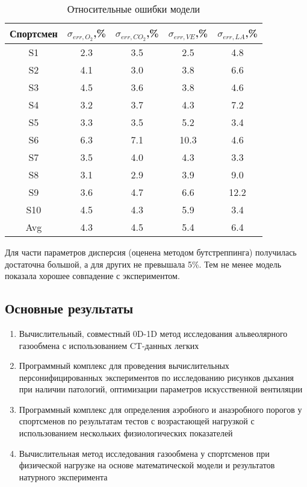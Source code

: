 \begin{table}[!ht]
\centering
\caption{Относительные ошибки модели}
\medskip
\label{tabular:tab3}
\begin{tabular}{|c|c|c|c|c|}
\hline
Спортсмен & \(\sigma_{err,O_{2}}\),\%  & \(\sigma_{err,CO_{2}}\),\% & \(\sigma_{err,VE}\),\% & \(\sigma_{err,LA}\),\%\\
\hline
S1 & 2.3 & 3.5 & 2.5 & 4.8 \\
\hline
S2 & 4.1 & 3.0 & 3.8 & 6.6 \\
\hline
S3 & 4.5 & 3.6 & 3.8 & 4.6  \\
\hline
S4 & 3.2 & 3.7 & 4.3 & 7.2  \\
\hline
S5 & 3.3 & 3.5 & 5.2 & 3.4  \\
\hline
S6 & 6.3 & 7.1 & 10.3 & 4.6  \\
\hline
S7 & 3.5 & 4.0 & 4.3 & 3.3  \\
\hline
S8 & 3.1 & 2.9 & 3.9 & 9.0  \\
\hline
S9 & 3.6 & 4.7 & 6.6 & 12.2  \\
\hline
S10 & 4.5 & 4.3 & 5.9 & 3.4  \\
\hline
Avg & 4.3 & 4.5 & 5.4 & 6.4  \\
\hline
\end{tabular}
\end{table}

Для части параметров дисперсия (оценена методом бутстреппинга) получилась достаточна большой, а для других не превышала 5\%. Тем не менее модель показала хорошее совпадение с экспериментом.

\subsection*{\Large Основные результаты}

\begin{enumerate}
 \item
 Вычислительный, совместный 0D-1D метод исследования альвеолярного газообмена с использованием CT-данных легких 
 \item
 Программный комплекс для проведения вычислительных персонифицированных экспериментов по исследованию рисунков дыхания при наличии патологий, оптимизации параметров искусственной вентиляции 
 \item
 Программный комплекс для определения аэробного и анаэробного порогов у спортсменов по результатам тестов с возрастающей нагрузкой с использованием нескольких физиологических показателей
 \item
 Вычислительная метод исследования газообмена у спортсменов при физической нагрузке на основе математической модели и результатов натурного эксперимента
   
\end{enumerate}

